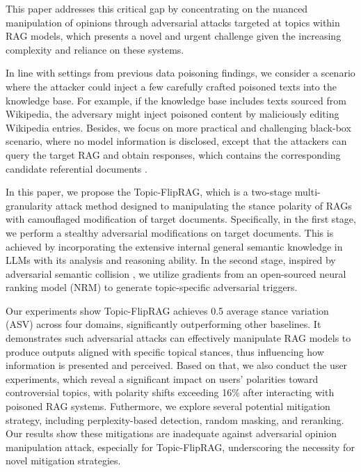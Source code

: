 This paper addresses this critical gap by concentrating on the nuanced manipulation of opinions through adversarial attacks targeted at topics within RAG models, which presents a novel and urgent challenge given the increasing complexity and reliance on these systems. 

In line with settings from previous data poisoning findings\cite{zou2024poisonedrag,carlini2024poisoning}, we consider a scenario where the attacker could inject a few carefully crafted poisoned texts into the knowledge base. For example, if the knowledge base includes texts sourced from Wikipedia, the adversary might inject poisoned content by maliciously editing Wikipedia entries.
Besides, we focus on more practical and challenging black-box scenario, where no model information is disclosed, except that the attackers can query the target RAG and obtain responses, which contains the corresponding candidate referential documents \cite{chen2025flipedragblackboxopinionmanipulation}. 

In this paper, we propose the Topic-FlipRAG, which is a two-stage multi-granularity attack method designed to manipulating the stance polarity of RAGs with camouflaged modification of target documents. Specifically, in the first stage, we perform a stealthy adversarial modifications on target documents. This is achieved by incorporating the extensive internal general semantic knowledge in LLMs with its analysis and reasoning ability.
In the second stage, inspired by adversarial semantic collision \cite{song2020adversarial}, we utilize gradients from an open-sourced neural ranking model (NRM) to generate topic-specific adversarial triggers.


Our experiments show Topic-FlipRAG achieves 0.5 average stance variation (ASV) across four domains, significantly outperforming other baselines. It demonstrates such adversarial attacks can effectively manipulate RAG models to produce outputs aligned with specific topical stances, thus influencing how information is presented and perceived. Based on that, we also conduct the user experiments, which reveal a significant impact on users’ polarities toward controversial topics, with polarity shifts exceeding 16\% after interacting with poisoned RAG systems. Futhermore, we explore several potential mitigation strategy, including perplexity-based detection, random masking, and reranking. Our results show these mitigations are inadequate against adversarial opinion manipulation attack, especially for Topic-FlipRAG, underscoring the necessity for novel mitigation strategies.

